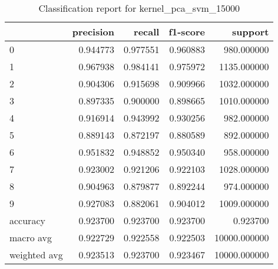 \begin{table}[htb!]
\centering
\caption{Classification report for kernel_pca_svm_15000}
\label{tab:classification-report-kernel_pca_svm_15000}
\begin{tabular}{lrrrr}
\toprule
 & precision & recall & f1-score & support \\
\midrule
0 & 0.944773 & 0.977551 & 0.960883 & 980.000000 \\
1 & 0.967938 & 0.984141 & 0.975972 & 1135.000000 \\
2 & 0.904306 & 0.915698 & 0.909966 & 1032.000000 \\
3 & 0.897335 & 0.900000 & 0.898665 & 1010.000000 \\
4 & 0.916914 & 0.943992 & 0.930256 & 982.000000 \\
5 & 0.889143 & 0.872197 & 0.880589 & 892.000000 \\
6 & 0.951832 & 0.948852 & 0.950340 & 958.000000 \\
7 & 0.923002 & 0.921206 & 0.922103 & 1028.000000 \\
8 & 0.904963 & 0.879877 & 0.892244 & 974.000000 \\
9 & 0.927083 & 0.882061 & 0.904012 & 1009.000000 \\
accuracy & 0.923700 & 0.923700 & 0.923700 & 0.923700 \\
macro avg & 0.922729 & 0.922558 & 0.922503 & 10000.000000 \\
weighted avg & 0.923513 & 0.923700 & 0.923467 & 10000.000000 \\
\bottomrule
\end{tabular}
\end{table}
